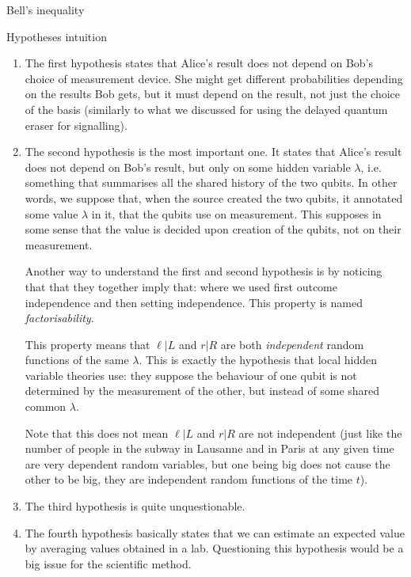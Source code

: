 \documentclass[a4paper]{article}
\begin{document}
\begin{parag}{Bell's inequality}
\begin{subparag}{Hypotheses intuition}
        \begin{enumerate}[left=0pt]
            \item The first hypothesis states that Alice's result does not depend on Bob's choice of measurement device.  She might get different probabilities depending on the results Bob gets, but it must depend on the result, not just the choice of the basis (similarly to what we discussed for using the delayed quantum eraser for signalling).
            \item The second hypothesis is the most important one. It states that Alice's result does not depend on Bob's result, but only on some hidden variable $\lambda$, i.e. something that summarises all the shared history of the two qubits. In other words, we suppose that, when the source created the two qubits, it annotated some value $\lambda$ in it, that the qubits use on measurement. This supposes in some sense that the value is decided upon creation of the qubits, not on their measurement.

            Another way to understand the first and second hypothesis is by noticing that that they together imply that:
            where we used first outcome independence and then setting independence. This property is named \textit{factorisability}.

            This property means that $\ell|L$ and $r|R$ are both \textit{independent} random functions of the same $\lambda$. This is exactly the hypothesis that local hidden variable theories use: they suppose the behaviour of one qubit is not determined by the measurement of the other, but instead of some shared common $\lambda$.

            Note that this does not mean $\ell | L$ and $r | R$ are not independent (just like the number of people in the subway in Lausanne and in Paris at any given time are very dependent random variables, but one being big does not cause the other to be big, they are independent random functions of the time $t$).
            
            \item The third hypothesis is quite unquestionable.
            \item The fourth hypothesis basically states that we can estimate an expected value by averaging values obtained in a lab. Questioning this hypothesis would be a big issue for the scientific method.
        \end{enumerate}
    \end{subparag}


\end{parag}
\end{document}
